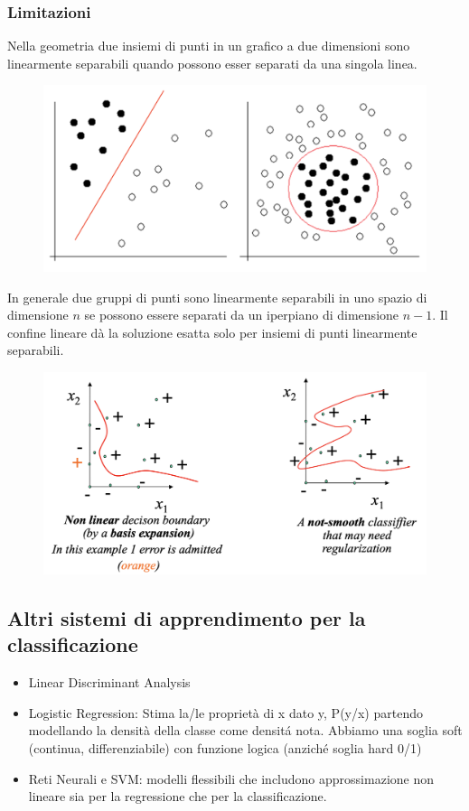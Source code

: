 \documentclass{article}
\begin{document}
\subsubsection{Limitazioni}
Nella geometria due insiemi di punti in un grafico a due dimensioni sono linearmente separabili quando possono esser separati da una singola linea. 
\begin{figure}[H]
\centering
\includegraphics[scale=0.5]{Images/linearnonlinearseparation.png}
\end{figure}
In generale due gruppi di punti sono linearmente separabili in uno spazio di dimensione $n$ se possono essere separati da un iperpiano di dimensione $n-1$. Il confine lineare dà la soluzione esatta solo per insiemi di punti linearmente separabili. 

\begin{figure}[H]
\centering
\includegraphics[scale=0.5]{Images/linearnonlinearseparation2.png}
\end{figure}

\subsection{Altri sistemi di apprendimento per la classificazione}
\begin{itemize}
    \item Linear Discriminant Analysis
    \item Logistic Regression: Stima la/le proprietà di x dato y, P(y/x) partendo modellando la densità della classe come densitá nota. Abbiamo una soglia soft (continua, differenziabile) con funzione logica (anziché soglia hard 0/1)
    \item Reti Neurali e SVM: modelli flessibili che includono approssimazione non lineare sia per la regressione che per la classificazione.
\end{itemize}
\end{document}
